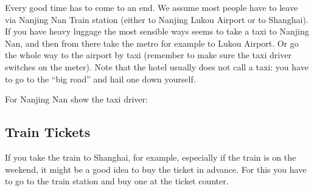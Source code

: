 \documentclass[11pt]{report}
\begin{document}
Every good time has to come to an end. We assume most people
have to leave via Nanjing Nan Train station (either to Nanjing
Lukou Airport or to Shanghai). If you have heavy luggage
the most sensible ways seems to take a taxi to Nanjing Nan, 
and then from there take the metro for example to Lukou 
Airport. Or go the whole way to the airport by taxi (remember to
make sure the taxi driver switches on the meter). Note that
the hotel usually does not call a taxi: you have to go to
the ``big road'' and hail one down yourself.\bigskip


\noindent
For Nanjing Nan show the taxi driver:
\begin{center}
\LARGE\addtolength{\fboxsep}{10mm}
\end{center}

\subsection*{Train Tickets}

If you take the train to Shanghai, for example, especially 
if the train is on the weekend, it might be a good idea to
buy the ticket in advance. For this you have to go to the
train station and buy one at the ticket counter.


%
\end{document}

